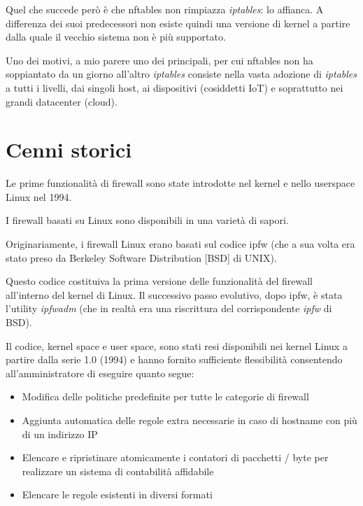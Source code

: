 Quel che succede però è che nftables non rimpiazza {\em iptables}: lo affianca.  A
differenza dei suoi predecessori non esiste quindi una versione di kernel a
partire dalla quale il vecchio sistema non è più supportato.

Uno dei motivi, a mio parere uno dei principali, per cui nftables non ha
soppiantato da un giorno all'altro {\em iptables} consiste nella vasta adozione di
{\em iptables} a tutti i livelli, dai singoli host, ai dispositivi (cosiddetti IoT) e
soprattutto nei grandi datacenter (cloud).

\chapter{Cenni storici}

\label{Cenni storici} %

Le prime funzionalità di firewall sono state introdotte nel kernel e nello
userspace Linux nel 1994.

I firewall basati su Linux sono disponibili in una varietà di sapori.

Originariamente, i firewall Linux erano basati sul codice ipfw (che a
sua volta era stato preso da Berkeley Software Distribution [BSD] di UNIX).

Questo codice costituiva la prima versione delle funzionalità del firewall
all'interno del kernel di Linux. Il successivo passo evolutivo, dopo ipfw, è
stata l'utility {\em ipfwadm} (che in realtà era una riscrittura del
corrispondente {\em ipfw} di BSD).

Il codice, kernel space e user space, sono stati resi disponibili nei kernel Linux
a partire dalla serie 1.0 (1994) e hanno fornito sufficiente flessibilità consentendo
all'amministratore di eseguire quanto segue:

\begin{itemize}

    \item Modifica delle politiche predefinite per tutte le categorie di
        firewall

    \item Aggiunta automatica delle regole extra necessarie in caso di
        hostname con più di un indirizzo IP
    
    \item Elencare e ripristinare atomicamente i contatori di pacchetti /
        byte per realizzare un sistema di contabilità affidabile

    \item Elencare le regole esistenti in diversi formati

\end{itemize}

